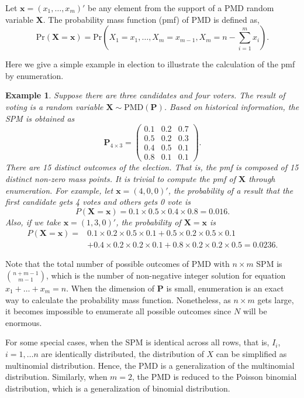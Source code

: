 \documentclass[12pt]{article}
\newcommand{\Pmat}{\mathbf{P}}
\newcommand{\PMD}{\textrm{PMD}}
\newcommand{\Xvec}{\boldsymbol{X}}
\newcommand{\xvec}{\boldsymbol{x}}
\newcommand{\qedw}{\hfill \ensuremath{\Box}}
\newtheorem{example}{Example}
\begin{document}
Let $\xvec = (x_1,\dots,x_m)'$ be any element from the support of a $\PMD$ random variable $\Xvec$. The probability mass function (pmf) of PMD is defined as,
$$\text{Pr}(\Xvec=\xvec) = \text{Pr} \left( X_1 = x_1, \dots, X_m = x_{m-1}, X_{m} = n-\sum_{i=1}^{m}x_i \right).$$

Here we give a simple example in election to illustrate the calculation of the pmf by enumeration.
\begin{example}%
Suppose there are three candidates and four voters. The result of voting is a random variable $\Xvec \sim \PMD(\Pmat)$. Based on historical information, the SPM is obtained as 
\begin{equation*}
\Pmat_{4 \times 3} = \begin{pmatrix}
0.1 &  0.2 & 0.7\\
0.5 & 0.2 & 0.3\\
0.4 &  0.5 & 0.1\\
0.8 & 0.1 & 0.1
\end{pmatrix}.
\end{equation*}
There are 15 distinct outcomes of the election. That is, the pmf is composed of 15 distinct non-zero mass points. It is trivial to compute the pmf of $\Xvec$ through enumeration. For example, let $\xvec =  (4,0,0)'$, the probability of a result that the first candidate gets 4 votes and others gets 0 vote is
\begin{equation*}
P\left( \Xvec = \xvec \right) = 0.1\times 0.5 \times 0.4 \times 0.8 = 0.016.
\end{equation*}
Also, if we take $\xvec=(1,3,0)'$, the probability of $\Xvec = \xvec$ is
\begin{align*}
P\left( \Xvec = \xvec \right)  =  & 0.1\times 0.2 \times 0.5 \times 0.1 +
 0.5\times0.2\times0.5 \times 0.1 \\
 & + 0.4\times0.2\times0.2\times0.1 + 0.8\times0.2\times0.2\times0.5 = 0.0236.
\end{align*}
\end{example}

Note that the total number of possible outcomes of $\PMD$ with $n \times m$ SPM is $\binom{n+m-1}{m-1}$, which is the number of non-negative integer solution for equation $x_1 + \dots + x_m = n$. When the dimension of $\Pmat$ is small, enumeration is an exact way to calculate the probability mass function. Nonetheless, as $n \times m$ gets large, it becomes impossible to enumerate all possible outcomes since $N$ will be enormous.  

For some special cases, when the SPM is identical across all rows, that is, $I_{i}$, $i = 1, \dots n$ are identically distributed, the distribution of $X$ can be simplified as multinomial distribution. Hence, the $\PMD$ is a generalization of the multinomial distribution. Similarly, when $m=2$, the $\PMD$ is reduced to the Poisson binomial distribution, which is a generalization of binomial distribution.
\end{document}
